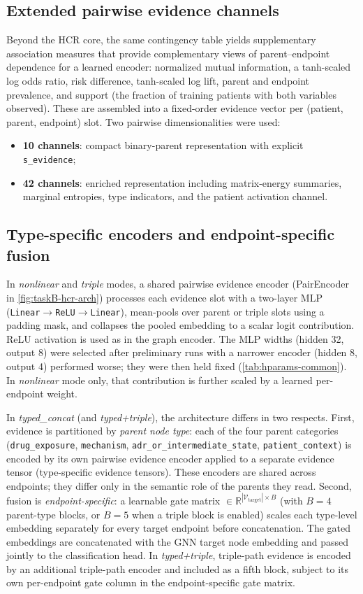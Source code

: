 \subsection{Extended pairwise evidence channels}
Beyond the HCR core, the same contingency table yields supplementary
association measures that
provide complementary views of parent--endpoint dependence for a learned
encoder: normalized mutual information, a tanh-scaled log odds ratio, risk
difference, tanh-scaled log lift, parent and endpoint prevalence, and
support (the fraction of training patients with both variables observed).
These are assembled into a fixed-order evidence vector per
(patient, parent, endpoint) slot. Two pairwise dimensionalities were used:
\begin{itemize}
  \item \textbf{10 channels}: compact
        binary-parent representation with explicit \texttt{s\_evidence};
  \item \textbf{42 channels}:
        enriched representation including matrix-energy summaries, marginal
        entropies, type indicators, and the patient activation channel.
\end{itemize}
\subsection{Type-specific encoders and endpoint-specific fusion}
In \emph{nonlinear} and \emph{triple} modes, a shared pairwise evidence encoder 
(PairEncoder in \cref{fig:taskB-hcr-arch})
processes each evidence slot with a two-layer MLP
(\texttt{Linear}$\rightarrow$\texttt{ReLU}$\rightarrow$\texttt{Linear}),
mean-pools over parent or triple slots using a padding mask, and collapses
the pooled embedding to a scalar logit contribution. ReLU activation
is used as in the graph encoder. The MLP widths (hidden 32, output 8) were 
selected after preliminary runs with a narrower encoder (hidden 8, output 4) 
performed worse; they were then held fixed (\cref{tab:hparams-common}). 
In \emph{nonlinear} mode only, that contribution is further scaled by a
learned per-endpoint weight.

In \emph{typed\_concat} (and \emph{typed+triple}), the architecture differs
in two respects.
First, evidence is partitioned by \emph{parent node type}: each of the four
parent categories
(\texttt{drug\_exposure}, \texttt{mechanism},
\texttt{adr\_or\_intermediate\_state}, \texttt{patient\_context}) is encoded
by its own pairwise evidence encoder applied to a separate evidence
tensor (type-specific evidence tensors).
These encoders are shared across endpoints; they differ only in the semantic
role of the parents they read.
Second, fusion is \emph{endpoint-specific}: a learnable gate matrix
\(\in \mathbb{R}^{|\mathcal{V}_{\mathrm{target}}| \times B}\)
(with $B=4$ parent-type blocks, or $B=5$ when a triple block is enabled)
scales each type-level embedding separately for every target endpoint before
concatenation.
The gated embeddings are concatenated with the GNN target node embedding and
passed jointly to the classification head.
In \emph{typed+triple}, triple-path evidence is encoded by an additional
triple-path encoder and included as a fifth block, subject to its
own per-endpoint gate column in the endpoint-specific gate matrix.

